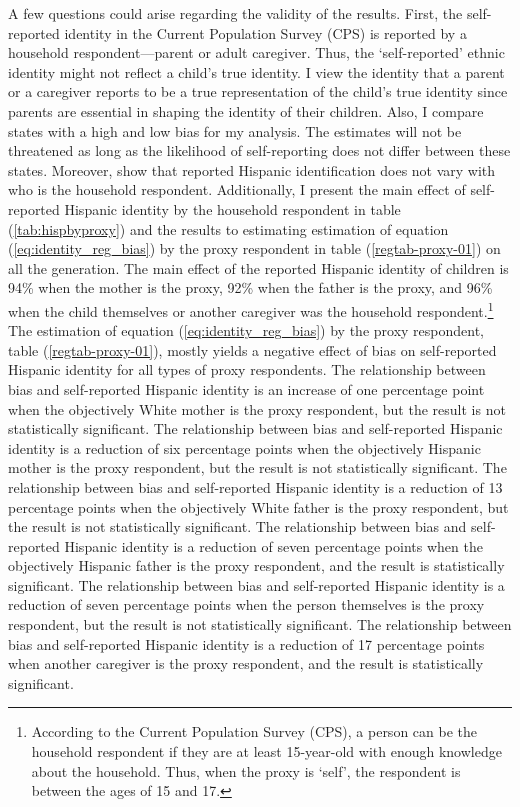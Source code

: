 \documentclass[12pt, fullpage]{article}
\begin{document}
A few questions could arise regarding the validity of the results. First, the self-reported identity in the Current Population Survey (CPS) is reported by a household respondent---parent or adult caregiver. Thus, the `self-reported' ethnic identity might not reflect a child's true identity. I view the identity that a parent or a caregiver reports to be a true representation of the child's true identity since parents are essential in shaping the identity of their children. Also, I compare states with a high and low bias for my analysis. The estimates will not be threatened as long as the likelihood of self-reporting does not differ between these states. 
Moreover, \citet{duncanIntermarriageIntergenerationalTransmission2011} show that reported Hispanic identification does not vary with who is the household respondent. Additionally, I present the main effect of self-reported Hispanic identity by the household respondent in table (\ref{tab:hispbyproxy}) and the results to estimating estimation of equation (\ref{eq:identity_reg_bias}) by the proxy respondent in table (\ref{regtab-proxy-01}) on all the generation. The main effect of the reported Hispanic identity of children is 94\% when the mother is the proxy, 92\% when the father is the proxy, and 96\% when the child themselves or another caregiver was the household respondent.\footnote{According to the Current Population Survey (CPS), a person can be the household respondent if they are at least 15-year-old with enough knowledge about the household. Thus, when the proxy is `self', the respondent is between the ages of 15 and 17.} The estimation of equation (\ref{eq:identity_reg_bias}) by the proxy respondent, table (\ref{regtab-proxy-01}), mostly yields a negative effect of bias on self-reported Hispanic identity for all types of proxy respondents. The relationship between bias and self-reported Hispanic identity is an increase of one percentage point when the objectively White mother is the proxy respondent, but the result is not statistically significant. The relationship between bias and self-reported Hispanic identity is a reduction of six percentage points when the objectively Hispanic mother is the proxy respondent, but the result is not statistically significant. The relationship between bias and self-reported Hispanic identity is a reduction of 13 percentage points when the objectively White father is the proxy respondent, but the result is not statistically significant. The relationship between bias and self-reported Hispanic identity is a reduction of seven percentage points when the objectively Hispanic father is the proxy respondent, and the result is statistically significant. The relationship between bias and self-reported Hispanic identity is a reduction of seven percentage points when the person themselves is the proxy respondent, but the result is not statistically significant. The relationship between bias and self-reported Hispanic identity is a reduction of 17 percentage points when another caregiver is the proxy respondent, and the result is statistically significant. 
\end{document}
